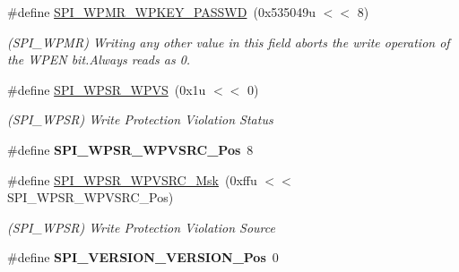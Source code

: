 \begin{DoxyCompactItemize}
\item 
\mbox{\label{group__SAMV71__SPI_gad5eacda218874e9f160526fd09b840f7}} 
\#define \mbox{\hyperlink{group__SAMV71__SPI_gad5eacda218874e9f160526fd09b840f7}{S\+P\+I\+\_\+\+W\+P\+M\+R\+\_\+\+W\+P\+K\+E\+Y\+\_\+\+P\+A\+S\+S\+WD}}~(0x535049u $<$$<$ 8)
\begin{DoxyCompactList}\small\item\em (S\+P\+I\+\_\+\+W\+P\+MR) Writing any other value in this field aborts the write operation of the W\+P\+EN bit.\+Always reads as 0. \end{DoxyCompactList}\item 
\mbox{\label{group__SAMV71__SPI_ga2fdfc086344d7f94c78b3411f9300ff6}} 
\#define \mbox{\hyperlink{group__SAMV71__SPI_ga2fdfc086344d7f94c78b3411f9300ff6}{S\+P\+I\+\_\+\+W\+P\+S\+R\+\_\+\+W\+P\+VS}}~(0x1u $<$$<$ 0)
\begin{DoxyCompactList}\small\item\em (S\+P\+I\+\_\+\+W\+P\+SR) Write Protection Violation Status \end{DoxyCompactList}\item 
\mbox{\label{group__SAMV71__SPI_gab5938ab029cbff7d33f85030efee59a1}} 
\#define {\bfseries S\+P\+I\+\_\+\+W\+P\+S\+R\+\_\+\+W\+P\+V\+S\+R\+C\+\_\+\+Pos}~8
\item 
\mbox{\label{group__SAMV71__SPI_ga85243137e58ab2f2dfe757f0d5847744}} 
\#define \mbox{\hyperlink{group__SAMV71__SPI_ga85243137e58ab2f2dfe757f0d5847744}{S\+P\+I\+\_\+\+W\+P\+S\+R\+\_\+\+W\+P\+V\+S\+R\+C\+\_\+\+Msk}}~(0xffu $<$$<$ S\+P\+I\+\_\+\+W\+P\+S\+R\+\_\+\+W\+P\+V\+S\+R\+C\+\_\+\+Pos)
\begin{DoxyCompactList}\small\item\em (S\+P\+I\+\_\+\+W\+P\+SR) Write Protection Violation Source \end{DoxyCompactList}\item 
\mbox{\label{group__SAMV71__SPI_ga91ca5db8decbc6bf25031c1c2e53ca14}} 
\#define {\bfseries S\+P\+I\+\_\+\+V\+E\+R\+S\+I\+O\+N\+\_\+\+V\+E\+R\+S\+I\+O\+N\+\_\+\+Pos}~0
\item 
\mbox{\label{group__SAMV71__SPI_gab64efacd84989bbd5c9588c8cc9c707f}} 
$$
\end{DoxyCompactItemize}
